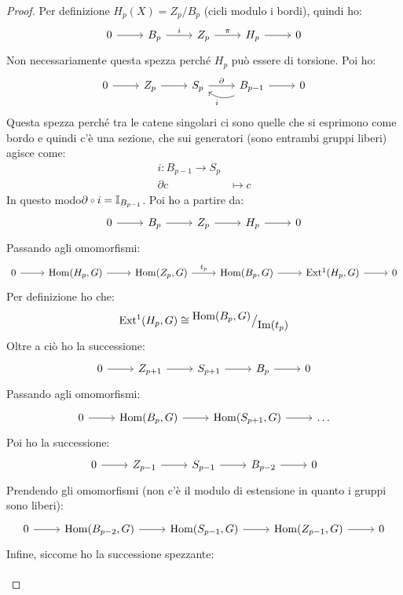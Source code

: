 \begin{proof}
  \noindent
  Per definizione $ H_p(X) = Z_p \slash B_p $ (cicli modulo i bordi), quindi ho:
  \[
    \begin{tikzcd}
      0 \rar & B_p \rar{i} & Z_p \rar{\pi} & H_p \rar & 0
    \end{tikzcd}
  \]
  Non necessariamente questa spezza perché $ H_p $ può essere di torsione.
  Poi ho:
  \[
    \begin{tikzcd}
      0 \rar & Z_p \rar & S_p \rar{\partial} & \arrow[bend left]{l}{i} B_{p-1} \rar & 0
    \end{tikzcd}
  \]
  Questa spezza perché tra le catene singolari ci sono quelle che si esprimono
  come bordo e quindi c'è una sezione, che sui generatori (sono entrambi gruppi
  liberi) agisce come:
  \begin{align*}
    i \colon B_{p-1} \to S_p \\
    \partial c & \mapsto c
  \end{align*}
  In questo modo$ \partial \circ i = \Id{B_{p-1}} $.
  Poi ho a partire da:
  \[
    \begin{tikzcd}
      0 \rar & B_p \rar & Z_p \rar & H_p \rar & 0
    \end{tikzcd}
  \]
  Passando agli omomorfismi:
  \[
    \begin{tikzcd}
      0 \rar & \hom{H_p, G} \rar & \hom{Z_p, G} \rar{t_p} & \hom{B_p, G} \rar & \ext{H_p, G} \rar & 0
    \end{tikzcd}
  \]
  Per definizione ho che:
  \[
    \mathrm{Ext^1}( H_p,G) \cong {^{\textstyle \mathrm{Hom}( B_p,G)}\big/_{\textstyle \mathrm{Im}( t_p )}}
  \]
  Oltre a ciò ho la successione:
  \[
    \begin{tikzcd}
      0 \rar & Z_{p+1} \rar & S_{p+1} \rar & B_p \rar & 0
    \end{tikzcd}
  \]
  Passando agli omomorfismi:
  \[
    \begin{tikzcd}
      0 \rar & \hom{B_p, G } \rar & \hom{S_{p+1}, G} \rar & \dots
    \end{tikzcd}
  \]
  Poi ho la successione:
  \[
    \begin{tikzcd}
      0 \rar & Z_{p-1} \rar & S_{p-1} \rar & B_{p-2} \rar & 0
    \end{tikzcd}
  \]
  Prendendo gli omomorfismi (non c'è il modulo di estensione in quanto i gruppi sono liberi):
  \[
    \begin{tikzcd}
      0 \rar & \hom{B_{p-2}, G} \rar & \hom{S_{p-1}, G} \rar & \hom{Z_{p-1}, G} \rar & 0
    \end{tikzcd}
  \]
  Infine, siccome ho la successione spezzante:
  \[
    \begin{tikzcd}

\end{tikzcd}\]
\end{proof}
